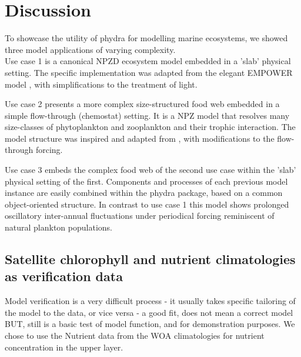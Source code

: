 \documentclass[template.tex]{subfiles}
\begin{document}
\section{Discussion}

\begin{comment}
This is where I can actually discuss the model results, this was my idea how to keep it separate from Section 3, for a clearer reading experience.

\end{comment}

To showcase the utility of phydra for modelling marine ecosystems, we showed three model applications of varying complexity.\\

Use case 1 is a canonical NPZD ecosystem model embedded in a 'slab' physical setting. The specific implementation was adapted from the elegant EMPOWER model \citep{Anderson2015c}, with simplifications to the treatment of light.

Use case 2 presents a more complex size-structured food web embedded in a simple flow-through (chemostat) setting. It is a NPZ model that resolves many size-classes of phytoplankton and zooplankton and their trophic interaction. The model structure was inspired and adapted from \citet{Banas2011b}, with modifications to the flow-through forcing. 

Use case 3 embeds the complex food web of the second use case within the 'slab' physical setting of the first. Components and processes of each previous model instance are easily combined within the phydra package, based on a common object-oriented structure. In contrast to use case 1 this model shows prolonged oscillatory inter-annual fluctuations under periodical forcing reminiscent of natural plankton populations.\\


\subsection{Satellite chlorophyll and nutrient climatologies as verification data}
Model verification is a very difficult process
- it usually takes specific tailoring of the model to the data, or vice versa \citep{Schartau2017}
- a good fit, does not mean a correct model \citep{RykielJr1996}\\

BUT, still is a basic test of model function, and for demonstration purposes.
We chose to use the Nutrient data from the WOA climatologies for nutrient concentration in the upper layer.
\end{document}
